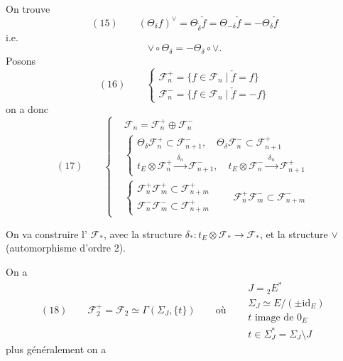 \documentclass[11pt,a4paper]{article}
\begin{document}
On trouve
\[
  (15) \qquad (\Theta_\delta f)^\vee = \Theta_{\check\delta} \check f =
  \Theta_{-\delta} \check f = -\Theta_\delta \check f
\]
i.e.
\[
  \vee \circ \Theta_\delta = -\Theta_\delta \circ \vee .
\]
Posons
\[
  (16) \qquad
  \begin{cases}
    \mathcal{F}_n^+ = \{ f \in \mathcal{F}_n \mid \check f = f \} \\
    \mathcal{F}_n^- = \{ f \in \mathcal{F}_n \mid \check f = -f \}
  \end{cases}
\]
on a donc
\[
  (17) \qquad
  \left\{
  \begin{aligned}
    & \mathcal{F}_n = \mathcal{F}_n^+ \oplus \mathcal{F}_n^- \\
    & \begin{cases}
        \Theta_\delta \mathcal{F}_n^+ \subset \mathcal{F}_{n+1}^- , \quad
        \Theta_\delta \mathcal{F}_n^- \subset \mathcal{F}_{n+1}^+ \\
        t_E \otimes \mathcal{F}_n^+ \xrightarrow{\;\delta_n\;} \mathcal{F}_{n+1}^- , \quad
        t_E \otimes \mathcal{F}_n^- \xrightarrow{\;\delta_n\;} \mathcal{F}_{n+1}^+
      \end{cases} \\
    & \begin{cases}
        \mathcal{F}_n^+ \mathcal{F}_m^+ \subset \mathcal{F}_{n+m}^+ \\
        \mathcal{F}_n^- \mathcal{F}_m^- \subset \mathcal{F}_{n+m}^+
      \end{cases}
      \qquad \mathcal{F}_n^+ \mathcal{F}_m^- \subset \mathcal{F}_{n+m}^-
  \end{aligned}
  \right.
\]

On va construire l' $\mathcal{F}_*$, avec la structure
$\delta_* : t_E \otimes \mathcal{F}_* \to \mathcal{F}_*$,  et la structure
$\vee$ (automorphisme d'ordre 2).

On a
\[
  (18) \qquad \mathcal{F}_2^+ = \mathcal{F}_2 \simeq \Gamma(\Sigma_J, \{t\})
  \qquad \text{où}\quad
  \begin{aligned}
    & J = {}_2E^* \\
    & \Sigma_J \simeq E/(\pm \mathrm{id}_E) \\
    & t \text{ image de } 0_E \\
    & t \in \Sigma_J^* = \Sigma_J \setminus J
  \end{aligned}
\]
plus généralement on a
\end{document}
